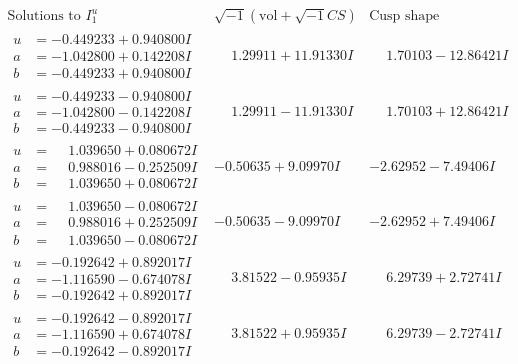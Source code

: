 \documentclass[1p]{elsarticle_modified}
\theoremstyle{definition}
\newcommand{\I}{\sqrt{-1}}
\begin{document}
$$\begin{array}{c|c|c}  
\text{Solutions to }I^u_{1}& \I (\text{vol} + \sqrt{-1}CS) & \text{Cusp shape}\\
 \hline 
\begin{aligned}
u &= -0.449233 + 0.940800 I \\
a &= -1.042800 + 0.142208 I \\
b &= -0.449233 + 0.940800 I\end{aligned}
 & \phantom{-}1.29911 + 11.91330 I & \phantom{-}1.70103 - 12.86421 I \\ \hline\begin{aligned}
u &= -0.449233 - 0.940800 I \\
a &= -1.042800 - 0.142208 I \\
b &= -0.449233 - 0.940800 I\end{aligned}
 & \phantom{-}1.29911 - 11.91330 I & \phantom{-}1.70103 + 12.86421 I \\ \hline\begin{aligned}
u &= \phantom{-}1.039650 + 0.080672 I \\
a &= \phantom{-}0.988016 - 0.252509 I \\
b &= \phantom{-}1.039650 + 0.080672 I\end{aligned}
 & -0.50635 + 9.09970 I & -2.62952 - 7.49406 I \\ \hline\begin{aligned}
u &= \phantom{-}1.039650 - 0.080672 I \\
a &= \phantom{-}0.988016 + 0.252509 I \\
b &= \phantom{-}1.039650 - 0.080672 I\end{aligned}
 & -0.50635 - 9.09970 I & -2.62952 + 7.49406 I \\ \hline\begin{aligned}
u &= -0.192642 + 0.892017 I \\
a &= -1.116590 - 0.674078 I \\
b &= -0.192642 + 0.892017 I\end{aligned}
 & \phantom{-}3.81522 - 0.95935 I & \phantom{-}6.29739 + 2.72741 I \\ \hline\begin{aligned}
u &= -0.192642 - 0.892017 I \\
a &= -1.116590 + 0.674078 I \\
b &= -0.192642 - 0.892017 I\end{aligned}
 & \phantom{-}3.81522 + 0.95935 I & \phantom{-}6.29739 - 2.72741 I \\ \hline\begin{aligned}

\end{aligned}
\end{array}$$
\end{document}
